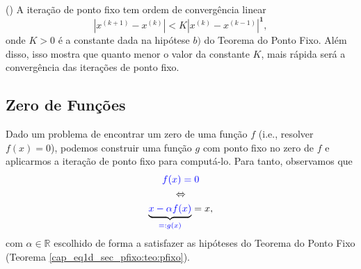 \begin{obs}()
  A iteração de ponto fixo tem ordem de convergência linear
  \begin{equation}
    |x^{(k+1)} - x^{(k)}| < K|x^{(k)} - x^{(k-1)}|^{\pmb{1}},
  \end{equation}
onde $K > 0$ é a constante dada na hipótese $b)$ do Teorema do Ponto Fixo. Além disso, isso mostra que quanto menor o valor da constante $K$, mais rápida será a convergência das iterações de ponto fixo.
\end{obs}


\subsection{Zero de Funções}

Dado um problema de encontrar um zero de uma função $f$ (i.e., resolver $f(x)=0$), podemos construir uma função $g$ com ponto fixo no zero de $f$ e aplicarmos a iteração de ponto fixo para computá-lo. Para tanto, observamos que
\begin{gather}
  {\color{blue}f(x) = 0} \\
  \Leftrightarrow \\
  \underbrace{{\color{blue}x - \alpha f(x)}}_{\color{blue}=: g(x)} = x,
\end{gather}
com $\alpha\in\mathbb{R}$ escolhido de forma a satisfazer as hipóteses do Teorema do Ponto Fixo (Teorema \ref{cap_eq1d_sec_pfixo:teo:pfixo}).

